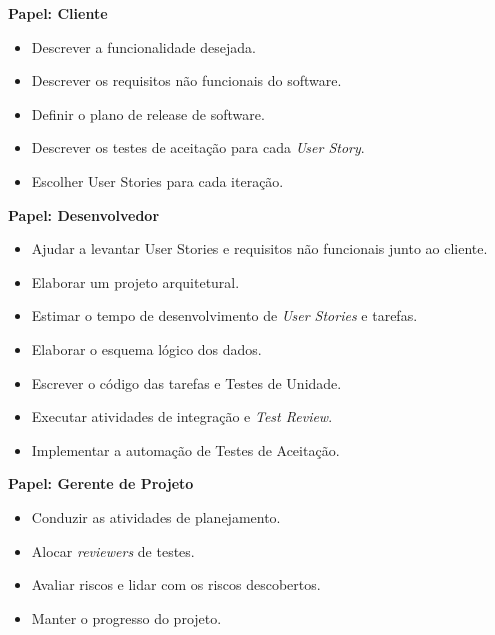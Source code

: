 \textbf{Papel: Cliente}
\begin{itemize}
 \item Descrever a funcionalidade desejada.
 \item Descrever os requisitos não funcionais do software.
 \item Definir o plano de release de software.
 \item Descrever os testes de aceitação para cada \textit{User Story}.
 \item Escolher User Stories para cada iteração.
\end{itemize}

\textbf{Papel: Desenvolvedor}
\begin{itemize}
 \item Ajudar a levantar User Stories e requisitos não funcionais junto ao cliente.
 \item Elaborar um projeto arquitetural.
 \item Estimar o tempo de desenvolvimento de \textit{User Stories} e tarefas.
 \item Elaborar o esquema lógico dos dados.
 \item Escrever o código das tarefas e Testes de Unidade.
 \item Executar atividades de integração e \textit{Test Review}.
 \item Implementar a automação de Testes de Aceitação.
\end{itemize}

\textbf{Papel: Gerente de Projeto}
\begin{itemize}
 \item Conduzir as atividades de planejamento.
 \item Alocar \textit{reviewers} de testes.
 \item Avaliar riscos e lidar com os riscos descobertos.
 \item Manter o progresso do projeto.
\end{itemize}


